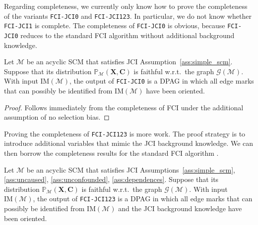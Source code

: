 \documentclass[twoside,11pt]{article}
\newcommand{\Prb}{\mathbb{P}}
\newcommand\B[1]{\bm{#1}}
\newcommand\C[1]{\mathcal{#1}}
\newcommand{\IM}{\mathrm{IM}}
\newcommand{\alg}[1]{\texttt{#1}}
\newcommand{\JCIABC}{\ref{ass:uncaused}, \ref{ass:unconfounded}, \ref{ass:dependences}}
\begin{document}
Regarding completeness, we currently only know how to prove the completeness of the variants \alg{FCI-JCI0} and \alg{FCI-JCI123}.
In particular, we do not know whether \alg{FCI-JCI1} is complete.
The completeness of \alg{FCI-JCI0} is obvious, because \alg{FCI-JCI0} reduces to the standard FCI algorithm without additional background knowledge.
\begin{theorem}\label{theo:fcijci0_complete}
  Let $\C{M}$ be an acyclic SCM that satisfies JCI Assumption~\ref{ass:simple_scm}. 
  Suppose that its distribution $\Prb_{\C{M}}(\B{X},\B{C})$ is faithful w.r.t.\ the graph $\C{G}(\C{M})$. 
  With input $\IM(\C{M})$, the output of \alg{FCI-JCI0} is a DPAG in which all edge marks that can possibly be identified from $\IM(\C{M})$ have been oriented.
\end{theorem}
\begin{proof}
  Follows immediately from the completeness of FCI \citep{Zhang2008_AI} under the additional assumption of no selection bias.
\end{proof}
Proving the completeness of \alg{FCI-JCI123} is more work. 
The proof strategy is to introduce additional variables that mimic the JCI background knowledge.
We can then borrow the completeness results for the standard FCI algorithm \citep{Zhang2008_AI}.
\begin{theorem}\label{theo:fcijci123_complete}
  Let $\C{M}$ be an acyclic SCM that satisfies JCI Assumptions~\ref{ass:simple_scm}, \JCIABC. 
  Suppose that its distribution $\Prb_{\C{M}}(\B{X},\B{C})$ is faithful w.r.t.\ the graph $\C{G}(\C{M})$. 
  With input $\IM(\C{M})$, the output of \alg{FCI-JCI123} is a DPAG in which all edge marks that can possibly be identified from $\IM(\C{M})$ and the JCI background knowledge have been oriented.
\end{theorem}
\end{document}
